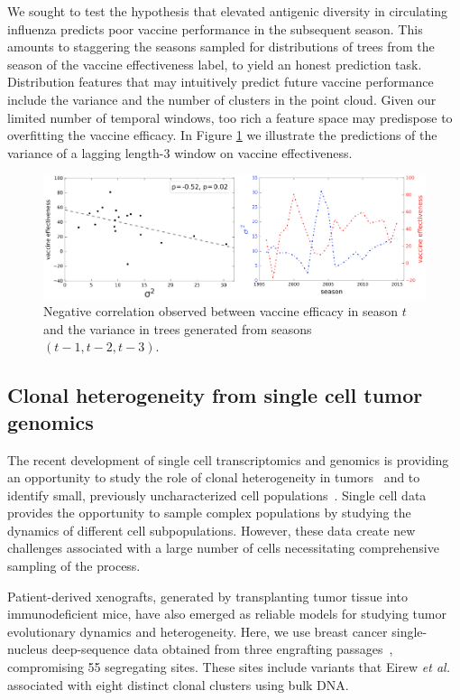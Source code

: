 \documentclass[a4paper,11pt]{article}
\begin{document}
We sought to test the hypothesis that elevated antigenic diversity in circulating influenza predicts poor vaccine performance in the subsequent season.
This amounts to staggering the seasons sampled for distributions of trees from the season of the vaccine effectiveness label, to yield an honest prediction task.
Distribution features that may intuitively predict future vaccine performance include the variance and the number of clusters in the point cloud.
Given our limited number of temporal windows, too rich a feature space may predispose to overfitting the vaccine efficacy.
In Figure \ref{fig:flu_VE} we illustrate the predictions of the variance of a lagging length-3 window on vaccine effectiveness. 

\begin{figure}
    \centering
    \includegraphics[width=\linewidth]{../figures/influenza_VE.png}
    \caption{Negative correlation observed between vaccine efficacy in season $t$ and the variance in trees generated from seasons $(t-1, t-2, t-3)$.}
    \label{fig:flu_VE}
\end{figure} 

\subsection{Clonal heterogeneity from single cell tumor genomics}

The recent development of single cell transcriptomics and genomics is providing an opportunity to study the role of clonal heterogeneity in tumors~\cite{navin2011tumour, eirew2014dynamics, patel2014single} and to identify small, previously uncharacterized cell populations~\cite{grun2015single}.
Single cell data provides the opportunity to sample complex populations by studying the dynamics of different cell subpopulations.
However, these data create new challenges associated with a large number of cells necessitating comprehensive sampling of the process.

Patient-derived xenografts, generated by transplanting tumor tissue into immunodeficient mice, have also emerged as reliable models for studying tumor evolutionary dynamics and heterogeneity.
Here, we use breast cancer single-nucleus deep-sequence data obtained from three engrafting passages~\cite{eirew2014dynamics}, compromising 55 segregating sites.
These sites include variants that Eirew \textit{et al.} associated with eight distinct clonal clusters using bulk DNA.
\end{document}
